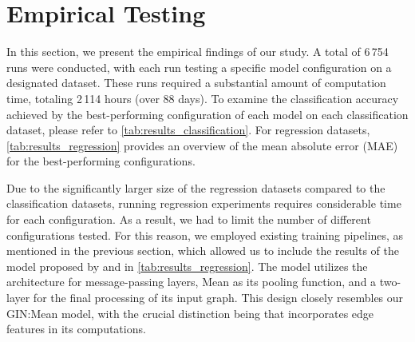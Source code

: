 \section{Empirical Testing}\label{sec:emprical_results}
In this section, we present the empirical findings of our study. A total of 6\,754 runs were conducted, with each run testing a specific model configuration on a designated dataset. These runs required a substantial amount of computation time, totaling 2\,114 hours (over 88 days). To examine the classification accuracy achieved by the best-performing configuration of each model on each classification dataset, please refer to \cref{tab:results_classification}. For regression datasets, \cref{tab:results_regression} provides an overview of the mean absolute error (MAE) for the best-performing configurations.

Due to the significantly larger size of the regression datasets compared to the classification datasets, running regression experiments requires considerable time for each configuration. As a result, we had to limit the number of different configurations tested. For this reason, we employed existing training pipelines, as mentioned in the previous section, which allowed us to include the results of the \gineeps model proposed by \cite{Mor+2020} and \cite{Morris2022} in \cref{tab:results_regression}.
The \gineeps model utilizes the \gin architecture for message-passing layers, \textsf{Mean} as its pooling function, and a two-layer \mlp for the final processing of its input graph. This design closely resembles our \textsf{GIN:Mean} model, with the crucial distinction being that \gineeps incorporates edge features in its computations.

